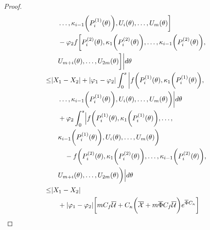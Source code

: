\documentclass[letterpaper, 10 pt, conference]{ieeeconf}  %
\begin{document}
\begin{proof}
\begin{align}
            & \quad \dots, \kappa_{i-1} \bigg( P_i^{(1)}(\theta) \bigg), U_i(\theta), \dots, U_m(\theta) \bigg] \nonumber \\
            & \quad - \varphi_2 f \bigg[ P_i^{(2)}(\theta), \kappa_1 \bigg( P_i^{(2)}(\theta) \bigg), \dots, \kappa_{i-1} \bigg( P_i^{(2)}(\theta) \bigg), \nonumber \\ 
            & \quad U_{m+i}(\theta), \dots, U_{2m}(\theta) \bigg] \bigg| d\theta \nonumber \\
        \leq& |X_1 - X_2|+ |\varphi_1 - \varphi_2| \int_{0}^s \bigg| f \bigg( P_i^{(1)}(\theta), \kappa_1 \bigg( P_i^{(1)}(\theta) \bigg),\nonumber \\ 
            & \quad \dots, \kappa_{i-1} \bigg( P_i^{(1)}(\theta) \bigg), U_i(\theta), \dots, U_m(\theta) \bigg) \bigg| d\theta \nonumber \\
            &\quad + \varphi_2 \int_{0}^s \Bigl| f \bigg( P_i^{(1)}(\theta), \kappa_1 \bigg( P_i^{(1)}(\theta) \bigg), \dots,\nonumber \\ 
            & \quad \kappa_{i-1} \bigg( P_i^{(1)}(\theta) \bigg), U_i(\theta), \dots, U_m(\theta) \bigg) \nonumber \\
            &\qquad - f \bigg( P_i^{(2)}(\theta), \kappa_1 \bigg( P_i^{(2)}(\theta) \bigg), \dots, \kappa_{i-1} \bigg( P_i^{(2)}(\theta) \bigg), \nonumber \\ 
            & \quad U_{m+i}(\theta), \dots, U_{2m}(\theta) \bigg) \Bigr| d\theta \nonumber \\
        \leq& |X_1 - X_2| \nonumber \\
            &\quad + |\varphi_1 - \varphi_2| \bigg[ m C_f \overline{\mathcal{U}} + C_{\kappa} \bigg( \overline{\mathcal{X}} + m \overline{\Phi} C_f \overline{\mathcal{U}} \bigg) e^{\overline{\Phi} C_{\kappa}} \bigg] \nonumber \\

\end{align}
\end{proof}
\end{document}
